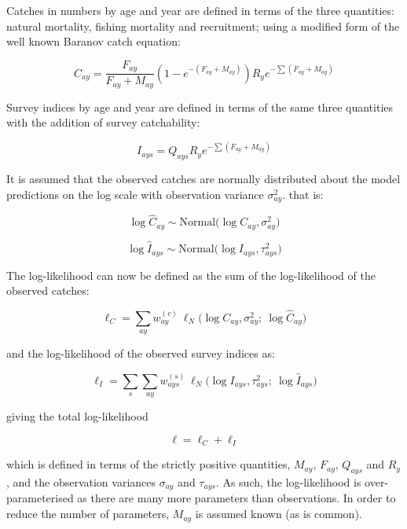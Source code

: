 \documentclass[
]{book}
\begin{document}
Catches in numbers by age and year are defined in terms of the three quantities: natural mortality, fishing mortality and recruitment; using a modified form of the well known Baranov catch equation:

\begin{equation}
C_{ay} = \frac{F_{ay}}{F_{ay}+M_{ay}}\left(1 - e^{-(F_{ay}+M_{ay})}\right) R_{y}e^{-\sum (F_{ay} + M_{ay})}
\end{equation}

Survey indices by age and year are defined in terms of the same three quantities with the addition of survey catchability:

\begin{equation}
I_{ays} = Q_{ays} R_{y}e^{-\sum (F_{ay} + M_{ay})}
\end{equation}

It is assumed that the observed catches are normally distributed about the model predictions on the log scale with observation variance \(\sigma^2_{ay}\). that is:

\begin{equation}
\log \hat{C}_{ay} \sim \text{Normal} \Big( \log C_{ay}, \sigma^2_{ay}\Big)
\end{equation}

\begin{equation}
\log \hat{I}_{ays} \sim \text{Normal} \Big( \log I_{ays}, \tau^2_{ays} \Big)
\end{equation}

The log-likelihood can now be defined as the sum of the log-likelihood of the observed catches:

\begin{equation}
\ell_C = \sum_{ay} w^{(c)}_{ay}\ \ell_N \Big( \log C_{ay}, \sigma^2_{ay} ;\ \log \hat{C}_{ay} \Big)
\end{equation}

and the log-likelihood of the observed survey indices as:

\begin{equation}
\ell_I = \sum_s \sum_{ay} w^{(s)}_{ays}\ \ell_N \Big( \log I_{ays}, \tau_{ays}^2 ;\ \log \hat{I}_{ays} \Big)
\end{equation}

giving the total log-likelihood

\begin{equation}
\ell = \ell_C + \ell_I
\end{equation}

which is defined in terms of the strictly positive quantities, \(M_{ay}\), \(F_{ay}\), \(Q_{ays}\) and \(R_{y}\), and the observation variances \(\sigma_{ay}\) and \(\tau_{ays}\). As such, the log-likelihood is over-parameterised as there are many more parameters than observations. In order to reduce the number of parameters, \(M_{ay}\) is assumed known (as is common).
\end{document}
